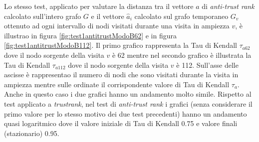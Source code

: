 Lo stesso test, applicato per valutare la distanza tra il vettore \(a\) di \textit{anti-trust rank} calcolato sull'intero grafo \(G\) e il vettore \(\hat{a}_i\) calcolato sul grafo temporaneo \(G_v\) ottenuto ad ogni intervallo di nodi visitati durante una visita in ampiezza \(v\), è illustrao in figura \ref{fig:test1antitrustModoB62} e in figura \ref{fig:test1antitrustModoB112}. Il primo grafico rappresenta la Tau di Kendall \(\tau_{a62}\)  dove il nodo sorgente della visita \(v\) è 62 mentre nel secondo grafico è illustrata la Tau di Kendall \(\tau_{a112}\) dove il nodo sorgente  della visita \(v\) è 112.  Sull'asse delle ascisse è rappresentao il numero di nodi che sono visitati durante la visita in ampiezza mentre sulle ordinate il corrispondente valore di Tau di Kendall \(\tau_a\). Anche in questo caso i due grafici hanno un andamento molto simile. Rispetto al test applicato a \textit{trustrank}, nel test di \textit{anti-trust rank}  i grafici (senza considerare il 
primo valore per lo stesso motivo dei due test precedenti) hanno un andamento quasi logaritmico dove il valore iniziale di Tau di Kendall 0.75 e  valore finali (stazionario) 0.95.


